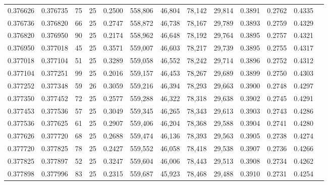 \begin{tabular}{rrrrrrrrrrrrr}
0.376626 & 0.376735 &    75 &  25 &                                     0.2500 & 558,806 &  46,804 &  78,142 &  29,814 & 0.3891 & 0.2762 & 0.4335 \\
0.376736 & 0.376820 &    66 &  25 &                                     0.2747 & 558,872 &  46,738 &  78,167 &  29,789 & 0.3893 & 0.2759 & 0.4329 \\
0.376820 & 0.376950 &    90 &  25 &                                     0.2174 & 558,962 &  46,648 &  78,192 &  29,764 & 0.3895 & 0.2757 & 0.4321 \\
0.376950 & 0.377018 &    45 &  25 &                                     0.3571 & 559,007 &  46,603 &  78,217 &  29,739 & 0.3895 & 0.2755 & 0.4317 \\
0.377018 & 0.377104 &    51 &  25 &                                     0.3289 & 559,058 &  46,552 &  78,242 &  29,714 & 0.3896 & 0.2752 & 0.4312 \\
0.377104 & 0.377251 &    99 &  25 &                                     0.2016 & 559,157 &  46,453 &  78,267 &  29,689 & 0.3899 & 0.2750 & 0.4303 \\
0.377252 & 0.377348 &    59 &  26 &                                     0.3059 & 559,216 &  46,394 &  78,293 &  29,663 & 0.3900 & 0.2748 & 0.4297 \\
0.377350 & 0.377452 &    72 &  25 &                                     0.2577 & 559,288 &  46,322 &  78,318 &  29,638 & 0.3902 & 0.2745 & 0.4291 \\
0.377453 & 0.377536 &    57 &  25 &                                     0.3049 & 559,345 &  46,265 &  78,343 &  29,613 & 0.3903 & 0.2743 & 0.4286 \\
0.377536 & 0.377625 &    61 &  25 &                                     0.2907 & 559,406 &  46,204 &  78,368 &  29,588 & 0.3904 & 0.2741 & 0.4280 \\
0.377626 & 0.377720 &    68 &  25 &                                     0.2688 & 559,474 &  46,136 &  78,393 &  29,563 & 0.3905 & 0.2738 & 0.4274 \\
0.377720 & 0.377825 &    78 &  25 &                                     0.2427 & 559,552 &  46,058 &  78,418 &  29,538 & 0.3907 & 0.2736 & 0.4266 \\
0.377825 & 0.377897 &    52 &  25 &                                     0.3247 & 559,604 &  46,006 &  78,443 &  29,513 & 0.3908 & 0.2734 & 0.4262 \\
0.377898 & 0.377996 &    83 &  25 &                                     0.2315 & 559,687 &  45,923 &  78,468 &  29,488 & 0.3910 & 0.2731 & 0.4254 \\

\end{tabular}
